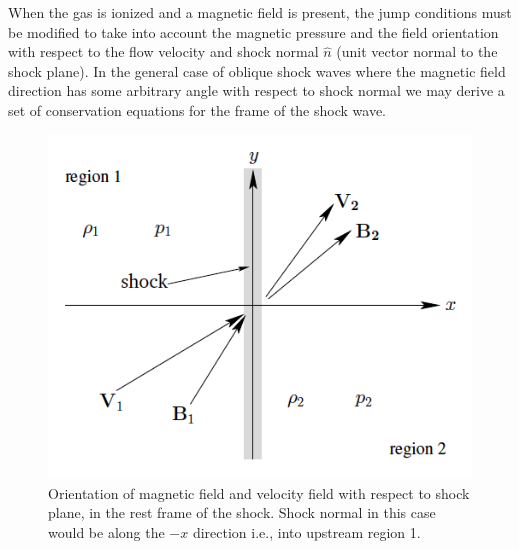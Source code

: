 When the gas is ionized and a magnetic field is present, the jump conditions must be modified to take into account the magnetic pressure and the field orientation with respect to the flow velocity and shock normal $\hat{n}$ (unit vector normal to the shock plane). In the general case of oblique shock waves where the magnetic field direction has some arbitrary angle with respect to shock normal we may derive a set of conservation equations for the frame of the shock wave. 
\begin{figure}[h!]
\begin{center}
\includegraphics[scale=0.5, angle=0]{images/shock_pic}
\caption{Orientation of magnetic field and velocity field with respect to shock plane, in the rest frame of the shock. Shock normal in this case would be along the $-x$ direction i.e., into upstream region 1. \citep{fitz}}
\label{fig:shock_pic}
\end{center}
\end{figure}

